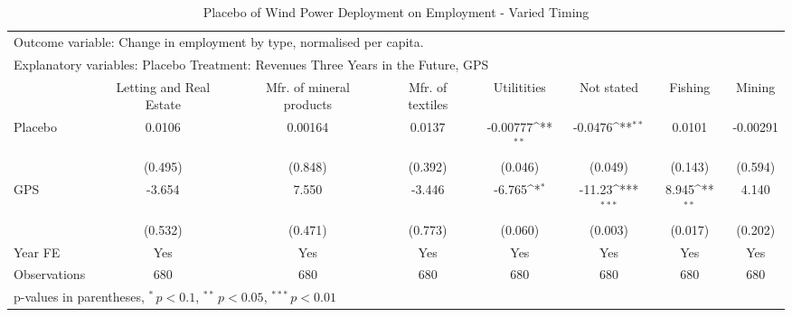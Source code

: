 \begin{table}[htbp]\centering
\def\sym#1{\ifmmode^{#1}\else\(^{#1}\)\fi}
\caption{Placebo of Wind Power Deployment on Employment - Varied Timing \label{employmentplacebo4}}
\begin{tabular*}{\hsize}{@{\hskip\tabcolsep\extracolsep\fill}l*{7}{c}}
\toprule
\multicolumn{7}{l}{\parbox{11cm}{Outcome variable: Change in employment by type, normalised per capita. }} \\ \multicolumn{7}{l}{\parbox{11cm}{Explanatory variables: Placebo Treatment: Revenues Three Years in the Future, GPS}} \\ \midrule & Letting and Real Estate & Mfr. of mineral products & Mfr. of textiles & Utilitities & Not stated & Fishing & Mining \\ \midrule
\addlinespace Placebo&      0.0106         &     0.00164         &      0.0137         &    -0.00777\sym{**} &     -0.0476\sym{**} &      0.0101         &    -0.00291         \\
            &     (0.495)         &     (0.848)         &     (0.392)         &     (0.046)         &     (0.049)         &     (0.143)         &     (0.594)         \\\addlinespace
GPS         &      -3.654         &       7.550         &      -3.446         &      -6.765\sym{*}  &      -11.23\sym{***}&       8.945\sym{**} &       4.140         \\
            &     (0.532)         &     (0.471)         &     (0.773)         &     (0.060)         &     (0.003)         &     (0.017)         &     (0.202)         \\\addlinespace
\midrule
\addlinespace Year FE&         Yes         &         Yes         &         Yes         &         Yes         &         Yes         &         Yes         &         Yes         \\
\addlinespace \midrule \addlinespace Observations&         680         &         680         &         680         &         680         &         680         &         680         &         680         \\
\bottomrule
\multicolumn{8}{l}{\footnotesize p-values in parentheses, $^{*}\, p<0.1$, $^{**}\, p<0.05$, $^{***}\, p<0.01$}\\
\end{tabular*}
\end{table}
